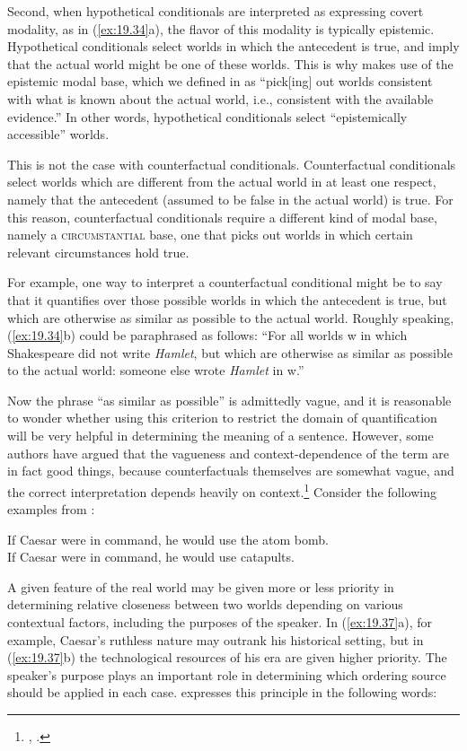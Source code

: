 Second, when hypothetical conditionals are interpreted as expressing covert modality, as in (\ref{ex:19.34}a), the flavor of this modality is typically epistemic. Hypothetical conditionals select worlds in which the antecedent is true, and imply that the actual world might be one of these worlds. This is why  makes use of the epistemic modal base, which we defined in  as “pick[ing] out worlds consistent with what is known about the actual world, i.e., consistent with the available evidence.” In other words, hypothetical conditionals select “epistemically accessible” worlds.


This is not the case with counterfactual  conditionals. Counterfactual  conditionals select worlds which are different from the actual world in at least one respect, namely that the antecedent (assumed to be false in the actual world) is true. For this reason, counterfactual  conditionals require a different kind of modal base, namely a \textsc{circumstantial} base, one that picks out worlds in which certain relevant circumstances hold true.


For example, one way to interpret a counterfactual  conditional might be to say that it quantifies over those possible worlds in which the antecedent is true, but which are otherwise as similar as possible to the actual world. Roughly speaking, (\ref{ex:19.34}b) could be paraphrased as follows: “For all worlds w in which Shakespeare did not write \textit{Hamlet}, but which are otherwise as similar as possible to the actual world: someone else wrote \textit{Hamlet} in w.”


Now the phrase “as similar as possible” is admittedly vague, and it is reasonable to wonder whether using this criterion to restrict the domain of quantification will be very helpful in determining the meaning of a sentence. However, some authors have argued that the vagueness and context-dependence of the term are in fact good things, because counterfactuals themselves are somewhat vague, and the correct interpretation depends heavily on context.\footnote{\citet[91ff]{Lewis1973a}, \citet{vonFintel2012}.} Consider the following examples from \citet[221]{Quine1960}:

\largerpage

\ea \label{ex:19.37}
\ea  If Caesar were in command, he would use the atom bomb.\\
\ex If Caesar were in command, he would use catapults.
                       \z
\z


A given feature of the real world may be given more or less priority in determining relative closeness between two worlds depending on various contextual factors, including the purposes of the speaker. In (\ref{ex:19.37}a), for example, Caesar’s ruthless nature may outrank his historical setting, but in (\ref{ex:19.37}b) the technological resources of his era are given higher priority. The speaker’s purpose plays an important role in determining which ordering source should be applied in each case. \citet[221]{Quine1960} expresses this principle in the following words:


